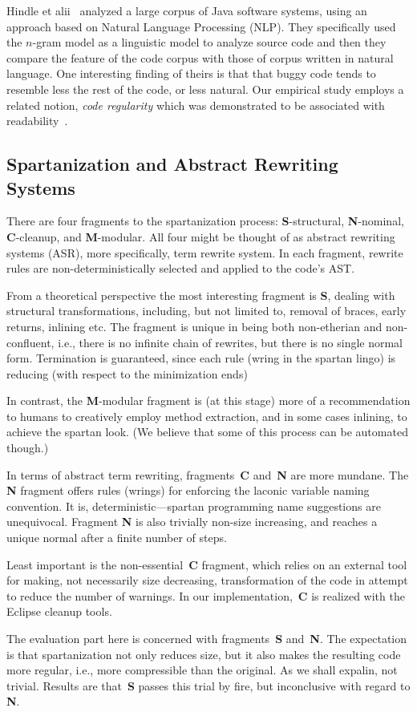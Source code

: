 Hindle et alii~\cite{Hindle:Bar:Su:Gabel:Devanbu:12} analyzed a large corpus of
Java software systems, using an approach based on Natural Language Processing
(NLP).  They specifically used the $n$-gram model as a linguistic model to
analyze source code and then they compare the feature of the code corpus with
those of corpus written in natural language. One interesting finding of theirs
is that that buggy code tends to resemble less the rest of the code, or less
natural. Our empirical study employs a related notion, \emph{code regularity}
which was demonstrated to be associated with
readability~\cite{Jbara:Feitelson:14}.

\subsection{Spartanization and Abstract Rewriting Systems}

There are four fragments to the spartanization process: \textbf{S}-structural,
\textbf{N}-nominal, \textbf{C}-cleanup, and \textbf{M}-modular. All four might
be thought of as abstract rewriting systems (ASR), more specifically, term
rewrite system. In each fragment, rewrite rules are non-deterministically
selected and applied to the code's AST. 

From a theoretical perspective the most interesting fragment is \textbf{S},
dealing with structural transformations, including, but not limited to, removal
of braces, early returns, inlining etc.  The fragment is unique in being both
non-etherian and non-confluent, i.e., there is no infinite chain of rewrites,
but there is no single normal form.  Termination is guaranteed, since each rule
(wring in the spartan lingo) is reducing (with respect to the minimization
ends) 

In contrast, the \textbf{M}-modular fragment is (at this stage) more of a
recommendation to humans to creatively employ method extraction, and in some
cases inlining, to achieve the spartan look. (We believe that some of this
process can be automated though.) 

In terms of abstract term rewriting, fragments~\textbf{C} and~\textbf{N} are
more mundane. The \textbf{N} fragment offers rules (wrings) for enforcing the
laconic variable naming convention. It is, deterministic---spartan programming
name suggestions are unequivocal. Fragment \textbf{N} is also trivially
non-size increasing, and reaches a unique normal after a finite number of
steps. 

Least important is the non-essential~\textbf{C} fragment, which relies on an
external tool for making, not necessarily size decreasing, transformation of
the code in attempt to reduce the number of warnings. In our
implementation,~\textbf{C} is realized with the Eclipse cleanup tools.

The evaluation part here is concerned with fragments~\textbf{S} 
and~\textbf{N}.  The expectation is that spartanization not only 
reduces size, but it also makes the resulting code more regular,
i.e., more compressible than the original. As we shall expalin, 
not trivial. Results are that~\textbf{S} passes this trial by fire,
but inconclusive with regard to \textbf{N}. 
